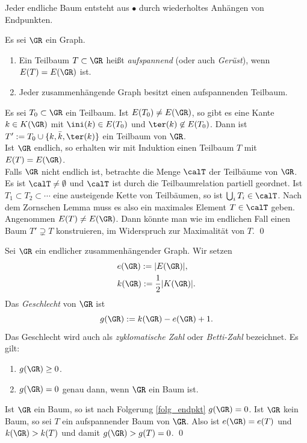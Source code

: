 \FOLG \label{folg_endpkt}
Jeder endliche Baum entsteht aus $\bullet$ durch wiederholtes
Anhängen von Endpunkten.

\DB Es sei $\GR$ ein Graph.
\begin{enumerate}
\item Ein Teilbaum $T\subset \GR$ heißt \emph{aufspannend}
(oder auch \emph{Gerüst}), wenn $E(T)=E(\GR)$ ist.
\item Jeder zusammenhängende Graph besitzt einen aufspannenden
Teilbaum.
\end{enumerate}
\bew
Es sei $T_0\subset \GR$ ein Teilbaum. Ist $E(T_0)\neq E(\GR)$,
so gibt es eine Kante $k\in K(\GR)$ mit
$\ini(k)\in E(T_0)$ und $\ter(k)\not\in E(T_0)$.
Dann ist $T' := T_0\cup\{k,\bar{k},\ter(k)\}$ ein Teilbaum von
$\GR$.\\
Ist $\GR$ endlich, so erhalten wir mit Induktion einen
Teilbaum $T$ mit $E(T)=E(\GR)$.\\
Falls $\GR$ nicht endlich ist, betrachte die Menge $\calT$ der
Teilbäume von $\GR$. Es ist $\calT\neq\emptyset$ und $\calT$
ist durch die Teilbaumrelation partiell geordnet.
Ist $T_1\subset T_2\subset \cdots$ eine austeigende Kette von
Teilbäumen, so ist $\bigcup_i T_i \in \calT$.
Nach dem Zornschen Lemma muss es also ein maximales Element
$T\in \calT$ geben.
Angenommen $E(T)\neq E(\GR)$. Dann könnte man wie im endlichen Fall
einen Baum $T'\supsetneq T$ konstruieren, im Widerspruch zur
Maximalität von $T$.
\qed

\DB \label{bem_geschlecht}
Sei $\GR$ ein endlicher zusammenhängender Graph.
Wir setzen
\begin{align*}
&e(\GR) := |E(\GR)|,\\
&k(\GR) := \frac{1}{2}|K(\GR)|.
\end{align*}
Das \emph{Geschlecht}
von $\GR$ ist
\[
g(\GR) := k(\GR) - e(\GR) + 1.
\]
Das Geschlecht wird auch als \emph{zyklomatische Zahl}
oder \emph{Betti-Zahl}
bezeichnet.
Es gilt:
\begin{enumerate}
\item $g(\GR) \geq 0$.
\item $g(\GR) = 0$ genau dann, wenn $\GR$ ein Baum ist.
\end{enumerate}
\bew Ist $\GR$ ein Baum, so ist nach Folgerung \ref{folg_endpkt}
$g(\GR)=0$. Ist $\GR$ kein Baum, so sei $T$ ein aufspannender Baum
von $\GR$. Also ist $e(\GR)=e(T)$ und $k(\GR)>k(T)$ und damit
$g(\GR)>g(T)=0$.
\qed

